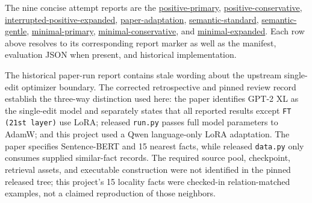 The nine concise attempt reports are the
\href{https://github.com/BurnyCoder/training-facts-into-llms/blob/ca83803ccdf46486d38fd7161b155cc20560c449/reports/runs/primary.md}{positive-primary},
\href{https://github.com/BurnyCoder/training-facts-into-llms/blob/ca83803ccdf46486d38fd7161b155cc20560c449/reports/runs/conservative.md}{positive-conservative},
\href{https://github.com/BurnyCoder/training-facts-into-llms/blob/ca83803ccdf46486d38fd7161b155cc20560c449/reports/runs/expanded.md}{interrupted-positive-expanded},
\href{https://github.com/BurnyCoder/training-facts-into-llms/blob/ca83803ccdf46486d38fd7161b155cc20560c449/reports/runs/paper_single_edit.md}{paper-adaptation},
\href{https://github.com/BurnyCoder/training-facts-into-llms/blob/ca83803ccdf46486d38fd7161b155cc20560c449/reports/runs/semantic_specificity.md}{semantic-standard},
\href{https://github.com/BurnyCoder/training-facts-into-llms/blob/ca83803ccdf46486d38fd7161b155cc20560c449/reports/runs/semantic_specificity_gentle.md}{semantic-gentle},
\href{https://github.com/BurnyCoder/training-facts-into-llms/blob/ca83803ccdf46486d38fd7161b155cc20560c449/reports/runs/minimal_pair_primary.md}{minimal-primary},
\href{https://github.com/BurnyCoder/training-facts-into-llms/blob/ca83803ccdf46486d38fd7161b155cc20560c449/reports/runs/minimal_pair_conservative.md}{minimal-conservative}, and
\href{https://github.com/BurnyCoder/training-facts-into-llms/blob/ca83803ccdf46486d38fd7161b155cc20560c449/reports/runs/minimal_pair_expanded.md}{minimal-expanded}.
Each row above resolves to its corresponding report marker as well as the
manifest, evaluation JSON when present, and historical implementation.

The historical paper-run report contains stale wording about the upstream
single-edit optimizer boundary. The corrected retrospective and pinned review
record establish the three-way distinction used here: the paper identifies
GPT-2 XL as the single-edit model and separately states that all reported
results except \texttt{FT (21st layer)} use LoRA; released \texttt{run.py}
passes full model parameters to AdamW; and this project used a Qwen
language-only LoRA adaptation. The paper specifies Sentence-BERT and 15
nearest facts, while released \texttt{data.py} only consumes supplied
similar-fact records. The required source pool, checkpoint, retrieval assets,
and executable construction were not identified in the pinned released tree;
this project's 15 locality facts were checked-in relation-matched examples,
not a claimed reproduction of those neighbors.
\endgroup
